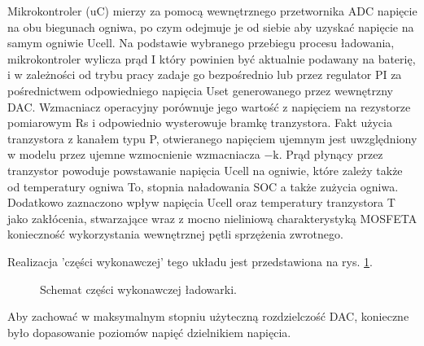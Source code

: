\documentclass[polish,engineer]{polsl-msth}
\begin{document}
Mikrokontroler (uC) mierzy za pomocą wewnętrznego przetwornika ADC napięcie na obu biegunach ogniwa, po czym odejmuje je od siebie aby uzyskać napięcie na samym ogniwie Ucell. Na podstawie wybranego przebiegu procesu ładowania, mikrokontroler wylicza prąd I który powinien być aktualnie podawany na baterię, i w zależności od trybu pracy zadaje go bezpośrednio lub przez regulator PI za pośrednictwem odpowiedniego napięcia Uset generowanego przez wewnętrzny DAC. Wzmacniacz operacyjny porównuje jego wartość z napięciem na rezystorze pomiarowym Rs i odpowiednio wysterowuje bramkę tranzystora. Fakt użycia tranzystora z kanałem typu P, otwieranego napięciem ujemnym jest uwzględniony w modelu przez ujemne wzmocnienie wzmacniacza $\mathrm{-k}$. Prąd płynący przez tranzystor powoduje powstawanie napięcia Ucell na ogniwie, które zależy także od temperatury ogniwa To, stopnia naładowania SOC a także zużycia ogniwa. Dodatkowo zaznaczono wpływ napięcia Ucell oraz temperatury tranzystora T jako zakłócenia, stwarzające wraz z mocno nieliniową charakterystyką MOSFETA konieczność wykorzystania wewnętrznej pętli sprzężenia zwrotnego.

Realizacja 'części wykonawczej' tego układu jest przedstawiona na rys. \ref{img:charging_circuit}. 
\begin{figure}[hbtp]
     \caption{Schemat części wykonawczej ładowarki. \label{img:charging_circuit}}
\end{figure}
Aby zachować w maksymalnym stopniu użyteczną rozdzielczość DAC, konieczne było dopasowanie poziomów napięć dzielnikiem napięcia.
\end{document}
